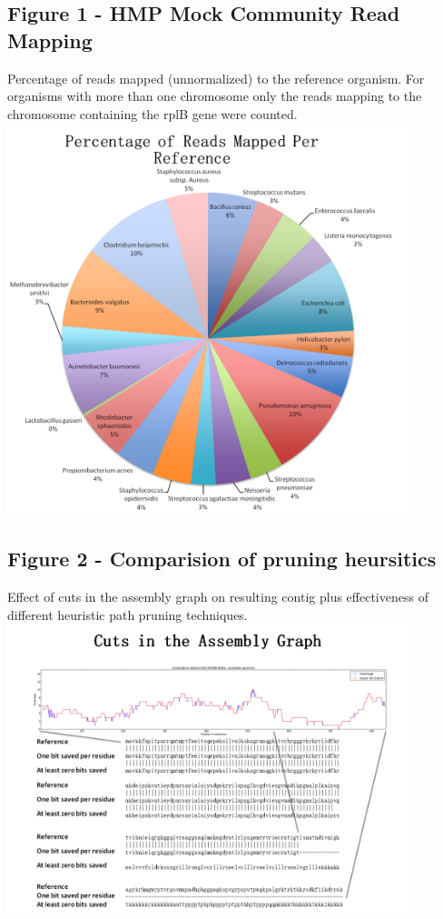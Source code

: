 \documentclass[10pt]{bmc_article}
\newenvironment{bmcformat}{\begin{raggedright}\baselineskip20pt\sloppy\setboolean{publ}{false}}{\end{raggedright}\baselineskip20pt\sloppy}
\begin{document}
\begin{bmcformat}
\subsection*{Figure 1 - HMP Mock Community Read Mapping}
  Percentage of reads mapped (unnormalized) to the reference organism.  For organisms with more than one chromosome only the reads mapping to the chromosome containing the rplB gene were counted.
  \includegraphics[width=117mm]{hmp_mock_community_mapping_chart.png}
\subsection*{Figure 2 - Comparision of pruning heursitics}
  Effect of cuts in the assembly graph on resulting contig plus effectiveness of different heuristic path pruning techniques.
  \includegraphics[width=117mm]{pruning_heuristics.png}

\end{bmcformat}
\end{document}
